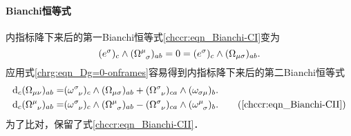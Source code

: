 
\paragraph{Bianchi恒等式}
内指标降下来后的第一Bianchi恒等式\eqref{chccr:eqn_Bianchi-CI}变为
\begin{equation}\label{chrg:eqn_Bianchi-CI-bak}
    (e^\sigma)_c \wedge (\Omega_{\hphantom{\sigma} \sigma} ^{\mu})_{ab} = 0 =
    (e^\sigma)_c \wedge (\Omega_{\mu \sigma} )_{ab}  .
\end{equation}
应用式\eqref{chrg:eqn_Dg=0-onframes}容易得到内指标降下来后的第二Bianchi恒等式 %
\begin{align}
    {\rm d}_c (\Omega_{\mu\nu} )_{ab} = &
       ( \omega _{\hphantom{\sigma} \nu}^\sigma )_c \wedge (\Omega_{\mu \sigma} )_{ab}
      +(\Omega_{\hphantom{\sigma} \nu} ^{\sigma})_{ca} \wedge (\omega_{\sigma \mu})_{b}
       . \label{chrg:eqn_Bianchi-CII-down} \\
    {\rm d}_c (\Omega_{\hphantom{\sigma} \nu} ^{\mu})_{ab}  =&
       ( \omega _{\hphantom{\sigma} \nu}^\sigma )_c  \wedge  (\Omega_{\hphantom{\sigma} \sigma} ^{\mu})_{ab}
     - (\Omega_{\hphantom{\sigma} \nu} ^{\sigma})_{ca}\wedge ( \omega _{\hphantom{\sigma} \sigma}^\mu )_b
       . \tag{\ref{chccr:eqn_Bianchi-CII}}
\end{align}
为了比对，保留了式\eqref{chccr:eqn_Bianchi-CII}．

